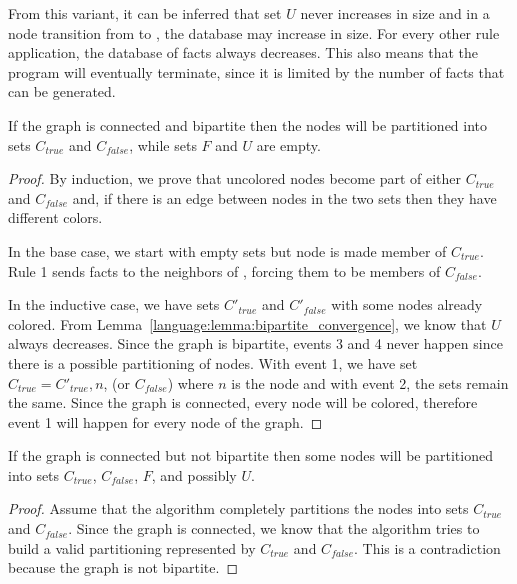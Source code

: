 From this variant, it can be inferred that set $U$ never increases in size
and in a node transition from  to , the
database may increase in size. For every other rule application, the database of
facts always decreases. This also means that the program will eventually
terminate, since it is limited by the number of  facts that can be
generated.

\begin{theorem}
If the graph is connected and bipartite then the nodes will be partitioned into sets
$C_{true}$ and $C_{false}$, while sets $F$ and $U$ are empty.
\end{theorem}
\begin{proof}
   By induction, we prove that uncolored nodes become part of either $C_{true}$
   and $C_{false}$ and, if there is an edge between nodes in the two sets then
   they have different colors.

   In the base case, we start with empty sets but node  is made
   member of $C_{true}$. Rule 1 sends  facts to the neighbors of
   , forcing them to be members of $C_{false}$.

   In the inductive case, we have sets $C'_{true}$ and $C'_{false}$ with some
   nodes already colored. From Lemma~\ref{language:lemma:bipartite_convergence},
   we know that $U$ always decreases. Since the graph is bipartite, events 3 and
   4 never happen since there is a possible partitioning of nodes. With event 1,
   we have set $C_{true} = C'_{true}, n$, (or $C_{false}$) where $n$ is the
   node and with event 2, the sets remain the same. Since the graph is
   connected, every node will be colored, therefore event 1 will happen for
   every node of the graph.
\end{proof}

\begin{theorem}

If the graph is connected but not bipartite then some nodes will be partitioned
into sets $C_{true}$, $C_{false}$, $F$, and possibly $U$.

\end{theorem}
\begin{proof}

Assume that the algorithm completely partitions the nodes into sets $C_{true}$
and $C_{false}$. Since the graph is connected, we know that the algorithm tries
to build a valid partitioning represented by $C_{true}$ and $C_{false}$. This is
a contradiction because the graph is not bipartite.

\end{proof}

